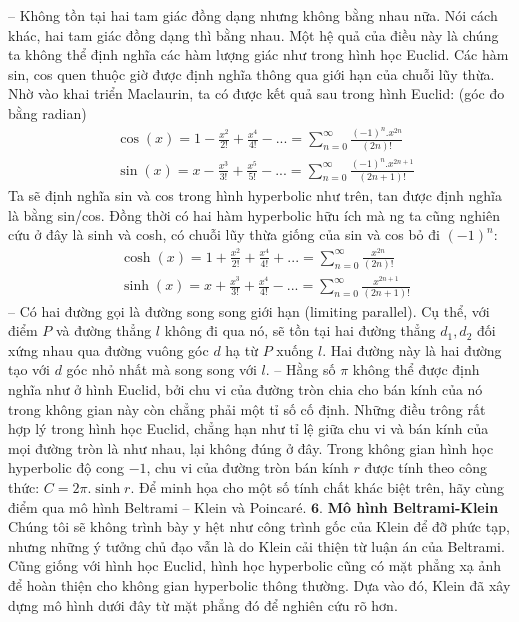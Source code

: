 \begin{multicols}{2}
	\vskip 0.1cm
	-- Không tồn tại hai tam giác đồng dạng nhưng không bằng nhau nữa. Nói cách khác, hai tam giác đồng dạng thì bằng nhau. 
	\vskip 0.1cm
	Một hệ quả của điều này là chúng ta không thể định nghĩa các hàm lượng giác như trong hình học Euclid. Các hàm sin, cos quen thuộc giờ được định nghĩa thông qua giới hạn của chuỗi lũy thừa. Nhờ vào khai triển Maclaurin, ta có được kết quả sau trong hình Euclid: (góc đo bằng radian)
	\begin{align*}
		&\cos(x) =  1 - \frac{x^2}{2!} + \frac{x^4}{4!} - ... = \sum_{n=0}^{\infty} \frac{(-1)^n.x^{2n}}{(2n)!} \\
		&\sin(x) =  x - \frac{x^3}{3!} + \frac{x^5}{5!} - ... = \sum_{n=0}^{\infty} \frac{(-1)^n.x^{2n+1}}{(2n+1)!}
	\end{align*}
	Ta sẽ định nghĩa sin và cos trong hình hyperbolic như trên, tan được định nghĩa là bằng sin/cos.
	Đồng thời có hai hàm hyperbolic hữu ích mà ng ta cũng nghiên cứu ở đây là sinh và cosh, có chuỗi lũy thừa giống của sin và cos bỏ đi $(-1)^n$:
	\begin{align*}
		&\cosh(x) =  1 + \frac{x^2}{2!} + \frac{x^4}{4!} + ... = \sum_{n=0}^{\infty} \frac{x^{2n}}{(2n)!} \\
		&\sinh(x) =  x + \frac{x^3}{3!} + \frac{x^4}{4!} - ... = \sum_{n=0}^{\infty} \frac{x^{2n+1}}{(2n+1)!}
	\end{align*}
	-- Có hai đường gọi là đường song song giới hạn (limiting parallel). Cụ thể, với điểm $P$ và đường thẳng $l$ không đi qua nó, sẽ tồn tại hai đường thẳng $d_1, d_2$ đối xứng nhau qua đường vuông góc $d$ hạ từ $P$ xuống $l$. Hai đường này là hai đường tạo với $d$ góc nhỏ nhất mà song song với $l$. 
	\vskip 0.1cm
	-- Hằng số $\pi$  không thể được định nghĩa như ở hình Euclid, bởi chu vi của đường tròn chia cho bán kính của nó trong không gian này còn chẳng phải một tỉ số cố định. Những điều trông rất hợp lý trong hình học Euclid, chẳng hạn như tỉ lệ giữa chu vi và bán kính của mọi đường tròn là như nhau, lại không đúng ở đây. Trong không gian hình học hyperbolic độ cong $-1$, chu vi của đường tròn bán kính $r$ được tính theo công thức: $C = 2\pi.\sinh r$. 
	\vskip 0.1cm
	Để minh họa cho một số tính chất khác biệt trên, hãy cùng điểm qua mô hình Beltrami -- Klein và Poincaré.  
	\vskip 0.1cm
	$\pmb{6. }$ \textbf{\color{lichsutoanhoc}Mô hình Beltrami-Klein}
	\vskip 0.1cm
	Chúng tôi sẽ không trình bày y hệt như công trình gốc của Klein để đỡ phức tạp, nhưng những ý tưởng chủ đạo vẫn là do Klein cải thiện từ luận án của Beltrami.
	Cũng giống với hình học Euclid, hình học hyperbolic cũng có mặt phẳng xạ ảnh để hoàn thiện cho không gian hyperbolic thông thường. Dựa vào đó, Klein đã xây dựng mô hình dưới đây từ mặt phẳng đó để nghiên cứu rõ hơn.

\end{multicols}
